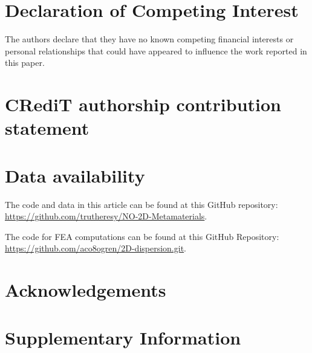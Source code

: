\documentclass[preprint,review,12pt]{elsarticle}
\begin{document}
\section*{Declaration of Competing Interest}
The authors declare that they have no known competing financial interests or personal relationships that could have appeared to influence the work reported in this paper.

\section*{CRediT authorship contribution statement}


\section*{Data availability}
\label{sec:Repository}
The code and data in this article can be found at this GitHub repository:
\url{https://github.com/trutheresy/NO-2D-Metamaterials}.

The code for FEA computations can be found at this GitHub Repository:
\url{https://github.com/aco8ogren/2D-dispersion.git}.

\section*{Acknowledgements}


% 


\clearpage
\appendix

\renewcommand{\thesection}{S\arabic{section}}
\renewcommand{\thesubsection}{S\arabic{section}.\arabic{subsection}}
\renewcommand{\thefigure}{S\arabic{figure}}
\renewcommand{\thetable}{S\arabic{table}}
\renewcommand{\theequation}{S\arabic{equation}}

\setcounter{figure}{0}
\setcounter{table}{0}
\setcounter{equation}{0}

\section{Supplementary Information}
\label{sec:supplement}
\end{document}
